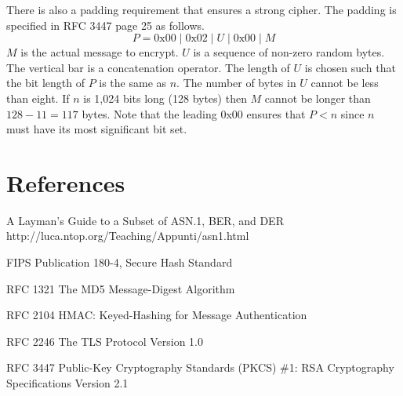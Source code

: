 \documentclass[11pt]{article}
\begin{document}
There is also a padding requirement that ensures a strong cipher.
The padding is specified in RFC 3447 page 25 as follows.
$$P=\text{0x00}\mid\text{0x02}\mid U\mid\text{0x00}\mid M$$
$M$ is the actual message to encrypt.
$U$ is a sequence of non-zero random bytes.
The vertical bar is a concatenation operator.
The length of $U$ is chosen such that the bit length of $P$ is the
same as $n$.
The number of bytes in $U$ cannot be less than eight.
If $n$ is 1,024 bits long (128 bytes) then $M$ cannot be longer than
$128-11=117$ bytes.
Note that the leading 0x00 ensures that $P<n$ since $n$ must have
its most significant bit set.

\section*{References}

A Layman's Guide to a Subset of ASN.1, BER, and DER\newline
http://luca.ntop.org/Teaching/Appunti/asn1.html

FIPS Publication 180-4, Secure Hash Standard

RFC 1321 The MD5 Message-Digest Algorithm

RFC 2104 HMAC: Keyed-Hashing for Message Authentication

RFC 2246 The TLS Protocol Version 1.0

RFC 3447 Public-Key Cryptography Standards (PKCS) \#1: RSA Cryptography
Specifications Version 2.1
\end{document}
